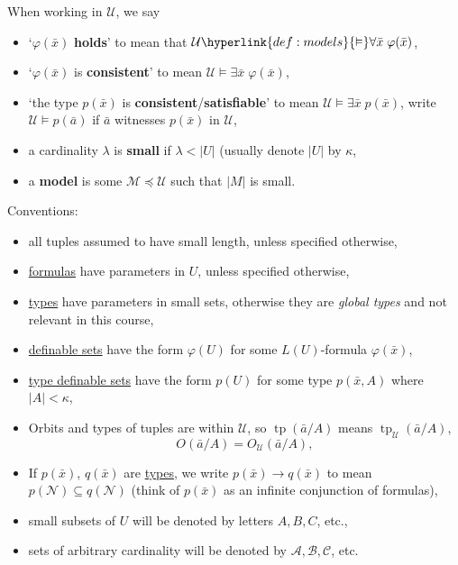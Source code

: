 \documentclass{article}
\let\models\vDash
\DeclareMathOperator{\tp}{tp}
\newcommand{\named}[1]{\textbf{#1}\index{#1}}
\begin{document}
\begin{ndef}\label{def:7.1}
  When working in $\mathcal{U}$, we say
  \begin{itemize}
    \item `$\varphi(\bar{x})$ \textbf{holds}' to mean that $\mathcal{U}\hyperlink{def:models}{\models}\forall \bar{x} \;\varphi(\bar{x})$,
    \item `$\varphi(\bar{x})$ is \textbf{consistent}' to mean $\mathcal{U}\models\exists\bar{x}\;\varphi(\bar{x})$,
    \item `the type $p(\bar{x})$ is \textbf{consistent}/\textbf{satisfiable}' to mean $\mathcal{U}\models\exists\bar{x}\;p(\bar{x})$, write $\mathcal{U} \models p(\bar a)$ if $\bar a$ witnesses $p(\bar x)$ in $\mathcal{U}$,
    \item a cardinality $\lambda$ is \hypertarget{def:small}{\named{small}} if $\lambda< |U|$ (usually denote $|U|$ by $\kappa$,
    \item a \textbf{model} is some $\mathcal{M}\preccurlyeq\mathcal{U}$ such that $|M|$ is small.
  \end{itemize}
  Conventions:
  \begin{itemize}
    \item all tuples assumed to have small length, unless specified otherwise,
    \item \hyperlink{def:form}{formulas} have parameters in $U$, unless specified otherwise,
    \item \hyperlink{def:type}{types} have parameters in small sets, otherwise they are \emph{global types} and not relevant in this course,
    \item \hyperlink{def:setdef}{definable sets} have the form $\varphi(U)$ for some $L(U)$-formula $\varphi(\bar{x})$,
    \item \hyperlink{def:setdef}{type definable sets} have the form $p(U)$ for some type $ p(\bar{x},A)$ where $|A| < \kappa$,
    \item Orbits and types of tuples are within $\mathcal{U}$, so $\tp(\bar{a}/A)$ means $\tp_{\mathcal{U}}(\bar{a}/A)$,
      \begin{equation*} O(\bar{a}/A)=O_{\mathcal{U}}(\bar{a}/A),
      \end{equation*}
    \item If $p(\bar{x})$, $q(\bar{x})$ are \hyperlink{def:type}{types}, we write $p(\bar{x})\to q(\bar{x})$ to mean $p(\mathcal{N})\subseteq q(\mathcal{N})$ (think of $p(\bar{x})$ as an infinite conjunction of formulas),
    \item small subsets of $U$ will be denoted by letters $A, B, C$, etc.,
    \item sets of arbitrary cardinality will be denoted by $\mathcal{A}, \mathcal{B}, \mathcal{C}$, etc.
  \end{itemize}
\end{ndef}
\end{document}
